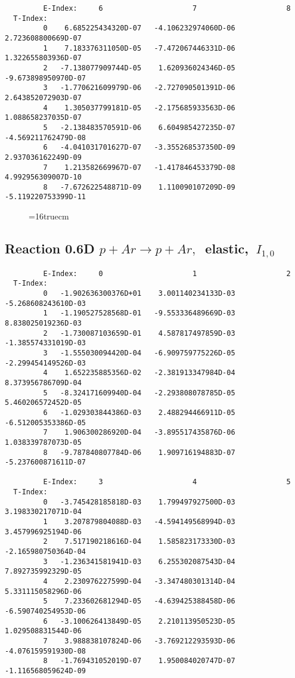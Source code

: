 \documentclass[12pt,dvipdfmx]{article}
\begin{document}
{\begin{small}
\begin{verbatim}
         E-Index:     6                     7                     8
  T-Index:
         0    6.685225434320D-07   -4.106232974060D-06    2.723608800669D-07
         1    7.183376311050D-05   -7.472067446331D-06    1.322655803936D-07
         2   -7.138077909744D-05    1.620936024346D-05   -9.673898950970D-07
         3   -1.770621609979D-06   -2.727090501391D-06    2.643852072903D-07
         4    1.305037799181D-05   -2.175685933563D-06    1.088658237035D-07
         5   -2.138483570591D-06    6.604985427235D-07   -4.569211762479D-08
         6   -4.041031701627D-07   -3.355268537350D-09    2.937036162249D-09
         7    1.213582669967D-07   -1.417846453379D-08    4.992956309007D-10
         8   -7.672622548871D-09    1.110090107209D-09   -5.119220753399D-11
\end{verbatim}\end{small}


\begin{figure} \label{0.6T}
\epsfxsize=16truecm
\end{figure}
\newpage

\subsection{
Reaction 0.6D  $p + Ar \rightarrow p + Ar ,\ $
 elastic, $\  I_{1,0}$
}

\begin{small}\begin{verbatim}
         E-Index:     0                     1                     2
  T-Index:
         0   -1.902636300376D+01    3.001140234133D-03   -5.268608243610D-03
         1   -1.190527528568D-01   -9.553336489669D-03    8.838025019236D-03
         2   -1.730087103659D-01    4.587817497859D-03   -1.385574331019D-03
         3   -1.555030094420D-04   -6.909759775226D-05   -2.299454149526D-03
         4    1.652235885356D-02   -2.381913347984D-04    8.373956786709D-04
         5   -8.324171609940D-04   -2.293808078785D-05    5.460206572452D-05
         6   -1.029303844386D-03    2.488294466911D-05   -6.512005353386D-05
         7    1.906300286920D-04   -3.895517435876D-06    1.038339787073D-05
         8   -9.787840807784D-06    1.909716194883D-07   -5.237600871611D-07

         E-Index:     3                     4                     5
  T-Index:
         0   -3.745428185818D-03    1.799497927500D-03    3.198330217071D-04
         1    3.207879804088D-03   -4.594149568994D-03    3.457996925194D-06
         2    7.517190218616D-04    1.585823173330D-03   -2.165980750364D-04
         3   -1.236341581941D-03    6.255302087543D-04    7.892735992329D-05
         4    2.230976227599D-04   -3.347480301314D-04    5.331115058296D-06
         5    7.233602681294D-05   -4.639425388458D-06   -6.590740254953D-06
         6   -3.100626413849D-05    2.210113950523D-05    1.029508831544D-06
         7    3.988838107824D-06   -3.769212293593D-06   -4.076159591930D-08
         8   -1.769431052019D-07    1.950084020747D-07   -1.116568059624D-09


\end{verbatim}
\end{small}}
\end{document}
